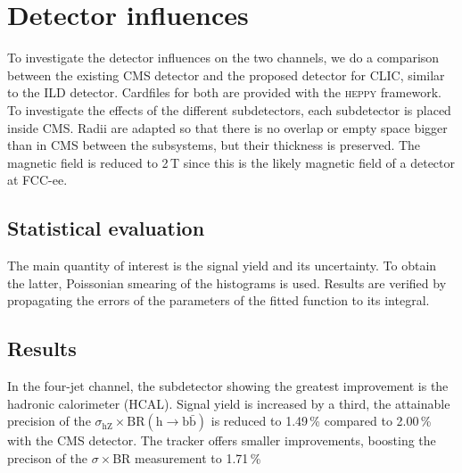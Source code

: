 \section{Detector influences}

To investigate the detector influences on the two channels, we do a comparison between the existing CMS detector and the proposed detector for CLIC, similar to the ILD detector. Cardfiles for both are provided with the \textsc{heppy} framework.
To investigate the effects of the different subdetectors, each subdetector is placed inside CMS. Radii are adapted so that there is no overlap or empty space bigger than in CMS between the subsystems, but their thickness is preserved. The magnetic field is reduced to 2\,T since this is the likely magnetic field of a detector at FCC-ee.

\subsection{Statistical evaluation}
The main quantity of interest is the signal yield and its uncertainty. To obtain the latter, Poissonian smearing of the histograms is used. Results are verified by propagating the errors of the parameters of the fitted function to its integral.

\subsection{Results}
In the four-jet channel, the subdetector showing the greatest improvement is the hadronic calorimeter (HCAL). Signal yield is increased by a third, the attainable precision of the $\sigma_\mathrm{hZ} \times \mathrm{BR(h \rightarrow b\bar{b})}$ is reduced to 1.49\,\% compared to 2.00\,\% with the CMS detector. The tracker offers smaller improvements, boosting the precison of the $\sigma \times $BR measurement to 1.71\,\%